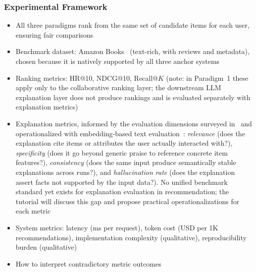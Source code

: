 \documentclass[sigconf,nonacm]{acmart}
\begin{document}
\subsubsection{Experimental Framework}
\begin{itemize}
    \item All three paradigms rank from the same set of candidate items for each user, ensuring fair comparisons
    \item Benchmark dataset: Amazon Books~\cite{amazon2023reviews} (text-rich, with reviews and metadata), chosen because it is natively supported by all three anchor systems
    \item Ranking metrics: HR@10, NDCG@10, Recall@$K$ (note: in Paradigm~1 these apply only to the collaborative ranking layer; the downstream LLM explanation layer does not produce rankings and is evaluated separately with explanation metrics)
    \item Explanation metrics, informed by the evaluation dimensions surveyed in~\cite{zhang2020explainable} and operationalized with embedding-based text evaluation~\cite{zhang2020bertscore}: \emph{relevance} (does the explanation cite items or attributes the user actually interacted with?), \emph{specificity} (does it go beyond generic praise to reference concrete item features?), \emph{consistency} (does the same input produce semantically stable explanations across runs?), and \emph{hallucination rate} (does the explanation assert facts not supported by the input data?). No unified benchmark standard yet exists for explanation evaluation in recommendation; the tutorial will discuss this gap and propose practical operationalizations for each metric
    \item System metrics: latency (ms per request), token cost (USD per 1K recommendations), implementation complexity (qualitative), reproducibility burden (qualitative)
    \item How to interpret contradictory metric outcomes
\end{itemize}
\end{document}

